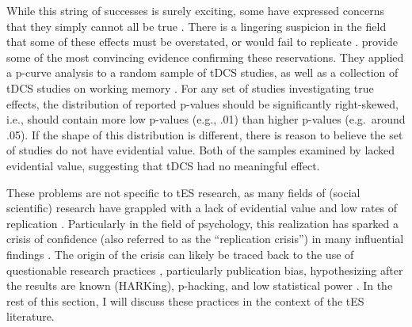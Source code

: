 \documentclass[11pt,english,]{memoir}
\begin{document}
While this string of successes is surely exciting, some have expressed concerns that they simply cannot all be true \autocites{Bestmann2017}{Parkin2015}. There is a lingering suspicion in the field that some of these effects must be overstated, or would fail to replicate \autocite{Heroux2017}. \textcite{Medina2017} provide some of the most convincing evidence confirming these reservations. They applied a p-curve analysis \autocite{Simonsohn2014} to a random sample of tDCS studies, as well as a collection of tDCS studies on working memory \autocite[from a meta-analysis by][]{Mancuso2016}. For any set of studies investigating true effects, the distribution of reported p-values should be significantly right-skewed, i.e., should contain more low p-values (e.g., .01) than higher p-values (e.g.~around .05). If the shape of this distribution is different, there is reason to believe the set of studies do not have evidential value. Both of the samples examined by \textcite{Medina2017} lacked evidential value, suggesting that tDCS had no meaningful effect.

These problems are not specific to tES research, as many fields of (social scientific) research have grappled with a lack of evidential value \autocites{Brodeur2016}{Simmons2017} and low rates of replication \autocites{OSC2015}{Camerer2018}{Klein2018}. Particularly in the field of psychology, this realization has sparked a crisis of confidence (also referred to as the ``replication crisis'') in many influential findings \autocites{Baker2015}{Pashler2012}. The origin of the crisis can likely be traced back to the use of questionable research practices \autocite{John2012}, particularly publication bias, hypothesizing after the results are known (HARKing), p-hacking, and low statistical power \autocites{Munafo2017}{Bishop2019}. In the rest of this section, I will discuss these practices in the context of the tES literature.
\end{document}
